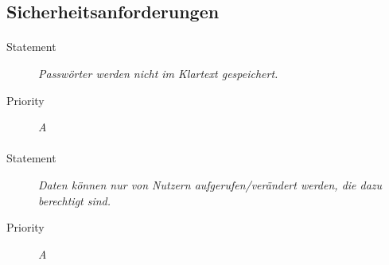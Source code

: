 \subsection{Sicherheitsanforderungen}
\paragraph{}
\begin{description}
\item [Statement] \textit{Passwörter werden nicht im Klartext gespeichert.}
\item [Priority] \textit{A}
\end{description}

\paragraph{}
\begin{description}
\item [Statement] \textit{Daten können nur von Nutzern aufgerufen/verändert werden, die dazu berechtigt sind.}
\item [Priority] \textit{A}
\end{description}
